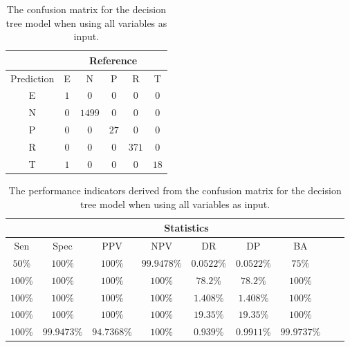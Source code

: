 \begin{table}[!ht]
	\centering
	\begin{tabular}{|c|c|c|c|c|c|}
		\hline
		 & \multicolumn{5}{|c|}{Reference} \\ \hline
		 Prediction & E & N & P & R & T \\ \hline
		 E & $1$ & $0$ & $0$ & $0$ & $0$ \\ \hline
		 N & $0$ & $1499$ & $0$ & $0$ & $0$ \\ \hline
		 P & $0$ & $0$ & $27$ & $0$ & $0$ \\ \hline
		 R & $0$ & $0$ & $0$ & $371$ & $0$ \\ \hline
		 T & $1$ & $0$ & $0$ & $0$ & $18$ \\ \hline
	\end{tabular}
	\caption{The confusion matrix for the decision tree model when using all variables as input.}
	\label{tab:cm:all:C5.0}
\end{table}

\begin{table}[!ht]
	\centering
	\begin{tabular}{|c|c|c|c|c|c|c|c|c|}
		\hline
		 & \multicolumn{7}{c|}{Statistics} \\ \hline
		Sen & Spec & PPV & NPV & DR & DP & BA \\ \hline
		$50\%$ & $100\%$ & $100\%$ & $99.9478\%$ & $0.0522\%$ & $0.0522\%$ & $75\%$ \\ \hline
		$100\%$ & $100\%$ & $100\%$ & $100\%$ & $78.2\%$ & $78.2\%$ & $100\%$ \\ \hline
		$100\%$ & $100\%$ & $100\%$ & $100\%$ & $1.408\%$ & $1.408\%$ & $100\%$ \\ \hline
		$100\%$ & $100\%$ & $100\%$ & $100\%$ & $19.35\%$ & $19.35\%$ & $100\%$ \\ \hline
		$100\%$ & $99.9473\%$ & $94.7368\%$ & $100\%$ & $0.939\%$ & $0.9911\%$ & $99.9737\%$ \\ \hline
	\end{tabular}
	\caption{The performance indicators derived from the confusion matrix for the decision tree model when using all variables as input.}
	\label{tab:cs:all:C5.0}
\end{table}
